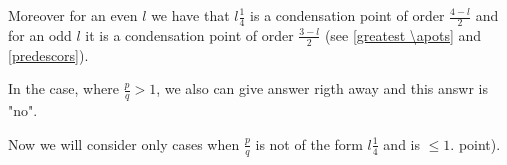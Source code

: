 Moreover for an even $l$ we have that $l\frac{1}{4}$ is a condensation point of order 
$\frac{4-l}{2}$ 
and for an odd $l$ it is a condensation point of order $\frac{3-l}{2}$ (see \ref{greatest \apots} 
and \ref{predescors}). 

In the case, where $\frac{p}{q} > 1$, we also can give answer rigth away and this answr is "no". 

Now we will consider only cases when $\frac{p}{q}$ is not of the form $l\frac{1}{4}$ and is 
$\leq 1$.
%
%
%
%
%
%
point). 
